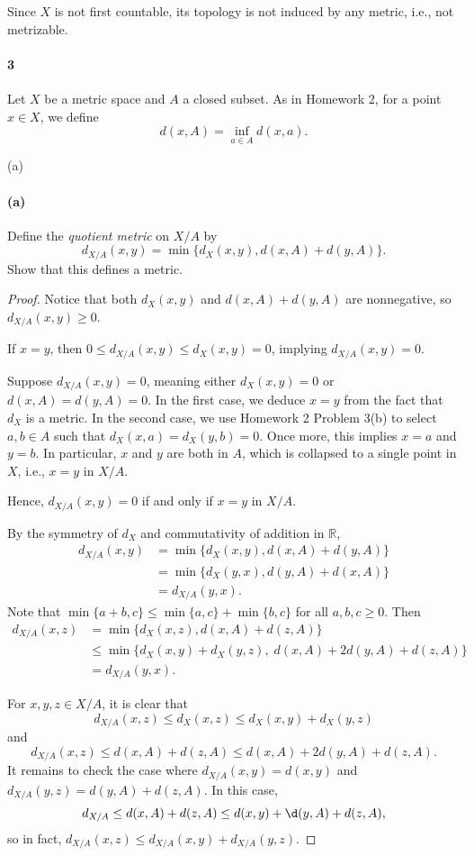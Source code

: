 \documentclass[12pt]{article}
\newlength{\myparskip}
\newenvironment{fullbox}{\begin{lrbox}{\savefullbox}\begin{minipage}{\dimexpr\textwidth-2\fboxsep\relax}\setlength{\parskip}{\myparskip}}{\end{minipage}\end{lrbox}\framebox[\textwidth]{\usebox{\savefullbox}}}
\newenvironment{pbox}[1][]{\begin{fullbox}\ifx#1\empty\else\paragraph{#1}\fi}{\end{fullbox}}
\newcommand{\R}{\mathbb{R}}
\newcommand{\<}{\langle}
\renewcommand{\>}{\rangle}
\theoremstyle{definition}
\begin{document}
Since $X$ is not first countable, its topology is not induced by any metric, i.e., not metrizable.


\newpage
\begin{pbox}[3]
    Let $X$ be a metric space and $A$ a closed subset.  As in Homework 2, for a point $x \in X$, we define
  \[d(x,A)=\inf_{a \in A} d(x,a).\]
\end{pbox}

\begin{pbox}[(a)]
    Define the \emph{quotient metric} on $X/A$ by
    \[d_{X/A}(x,y)=\min\{d_X(x,y),d(x,A)+d(y,A)\}.\]
    Show that this defines a metric.
\end{pbox}

\begin{proof}
    Notice that both $d_X(x, y)$ and $d(x, A) + d(y, A)$ are nonnegative, so $d_{X/A}(x, y) \geq 0$.

    If $x = y$, then $0 \leq d_{X/A}(x, y) \leq d_X(x, y) = 0$, implying $d_{X/A}(x, y) = 0$.

    Suppose $d_{X/A}(x, y) = 0$, meaning either $d_X(x, y) = 0$ or $d(x, A) = d(y, A) = 0$. In the first case, we deduce $x = y$ from the fact that $d_X$ is a metric. In the second case, we use Homework 2 Problem 3(b) to select $a, b \in A$ such that $d_X(x, a) = d_X(y, b) = 0$. Once more, this implies $x = a$ and $y = b$. In particular, $x$ and $y$ are both in $A$, which is collapsed to a single point in $X$, i.e., $x = y$ in $X/A$.

    Hence, $d_{X/A}(x, y) = 0$ if and only if $x = y$ in $X/A$.

    By the symmetry of $d_X$ and commutativity of addition in $\R$,
    \begin{align*}
        d_{X/A}(x,y)
            &=\min\{d_X(x,y),d(x,A)+d(y,A)\} \\
            &= \min\{d_X(y, x),d(y,A)+d(x,A)\} \\
            &= d_{X/A}(y, x).
    \end{align*}
    Note that $\min\{a + b, c\} \leq \min\{a, c\} + \min\{b, c\}$ for all $a, b, c \geq 0$. Then
    \begin{align*}
        d_{X/A}(x, z)
            &= \min\{d_X(x, z), d(x,A) + d(z, A)\} \\
            &\leq \min\{d_X(x, y) + d_X(y, z),\; d(x, A) + 2d(y, A) + d(z, A)\} \\
            &= d_{X/A}(y, x).
    \end{align*}

    For $x, y, z \in X/A$, it is clear that
    \[
        d_{X/A}(x, z) \leq d_X(x, z) \leq d_X(x, y) + d_X(y, z)
    \]
    and
    \[
        d_{X/A}(x, z) \leq d(x, A) + d(z, A) \leq d(x, A) + 2d(y, A) + d(z, A).
    \]
    It remains to check the case where $d_{X/A}(x, y) = d(x, y)$ and $d_{X/A}(y, z) = d(y, A) + d(z, A)$. In this case,
    \[
        d_{X/A} \leq d(x, A) + d(z, A) \leq d(x, y) + \d(y, A) + d(z, A),
    \]
    so in fact, $d_{X/A}(x, z) \leq d_{X/A}(x, y) + d_{X/A}(y, z)$.

\end{proof}
\end{document}

